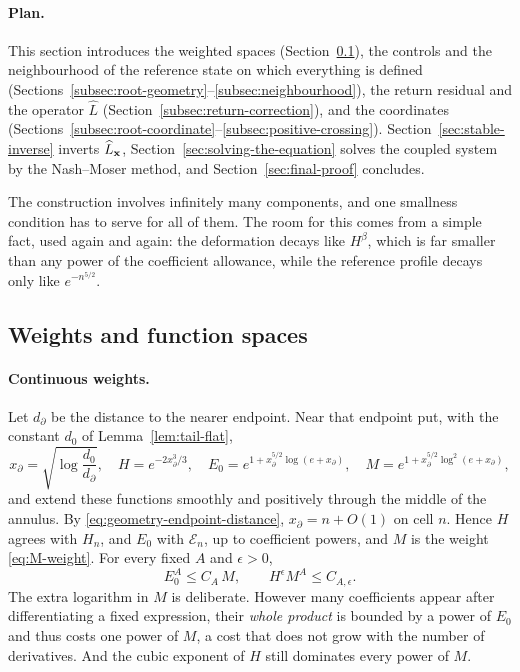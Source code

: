 \paragraph{Plan.}
This section introduces the weighted spaces
(Section~\ref{subsec:spaces}), the controls and the neighbourhood of
the reference state on which everything is defined
(Sections~\ref{subsec:root-geometry}--\ref{subsec:neighbourhood}), the
return residual and the operator $\widehat L$
(Section~\ref{subsec:return-correction}), and the coordinates
(Sections~\ref{subsec:root-coordinate}--\ref{subsec:positive-crossing}).
Section~\ref{sec:stable-inverse} inverts $\widehat L_{\mathbf x}$,
Section~\ref{sec:solving-the-equation} solves the coupled system by the
Nash--Moser method, and Section~\ref{sec:final-proof} concludes.

The construction involves infinitely many components, and one
smallness condition has to serve for all of them. The room for this
comes from a simple fact, used again and again: the deformation
decays like $H^\beta$, which is far smaller than any power of the
coefficient allowance, while the reference profile decays only like
$e^{-n^{5/2}}$.

\subsection{Weights and function spaces}
\label{subsec:spaces}

\paragraph{Continuous weights.}
Let $d_\partial$ be the distance to the nearer endpoint. Near that
endpoint put, with the constant $d_0$ of
Lemma~\ref{lem:tail-flat},
\begin{equation}\label{eq:readable-physical-weights}
 x_\partial=\sqrt{\log\frac{d_0}{d_\partial}},\quad
 H=e^{-2x_\partial^3/3},\quad
 E_0=e^{1+x_\partial^{5/2}\log(e+x_\partial)},\quad
 M=e^{1+x_\partial^{5/2}\log^2(e+x_\partial)},
\end{equation}
and extend these functions smoothly and positively through the middle
of the annulus. By \eqref{eq:geometry-endpoint-distance},
$x_\partial=n+O(1)$ on cell $n$. Hence $H$ agrees with $H_n$, and
$E_0$ with $\mathcal E_n$, up to coefficient powers, and $M$ is the
weight \eqref{eq:M-weight}. For every fixed $A$ and $\epsilon>0$,
\begin{equation}\label{eq:full-material-envelope}
 E_0^A\le C_A\,M,\qquad H^\epsilon M^A\le C_{A,\epsilon}.
\end{equation}
The extra logarithm in $M$ is deliberate. However many coefficients
appear after differentiating a fixed expression, their \emph{whole
product} is bounded by a power of $E_0$ and thus costs one power of
$M$, a cost that does not grow with the number of derivatives. And
the cubic exponent of $H$ still dominates every power of $M$.

